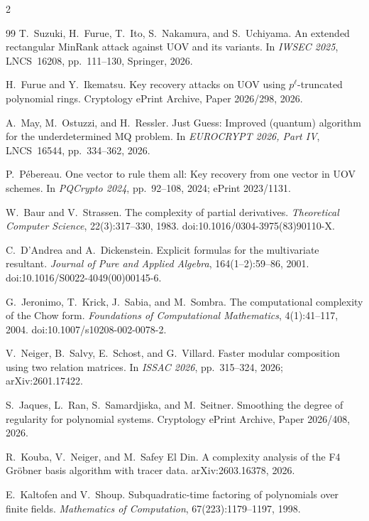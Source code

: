 \documentclass[11pt,a4paper]{article}
\theoremstyle{definition}
\theoremstyle{remark}
\begin{document}
\begin{multicols}{2}
\begin{thebibliography}{99}
T.~Suzuki, H.~Furue, T.~Ito, S.~Nakamura, and S.~Uchiyama.
\newblock An extended rectangular MinRank attack against UOV and its variants.
\newblock In \emph{IWSEC 2025}, LNCS~16208, pp.~111--130, Springer, 2026.

H.~Furue and Y.~Ikematsu.
\newblock Key recovery attacks on UOV using $p^\ell$-truncated polynomial rings.
\newblock Cryptology ePrint Archive, Paper 2026/298, 2026.

A.~May, M.~Ostuzzi, and H.~Ressler.
\newblock Just Guess: Improved (quantum) algorithm for the underdetermined MQ problem.
\newblock In \emph{EUROCRYPT 2026, Part IV}, LNCS~16544, pp.~334--362, 2026.

P.~P\'ebereau.
\newblock One vector to rule them all: Key recovery from one vector in UOV schemes.
\newblock In \emph{PQCrypto 2024}, pp.~92--108, 2024; ePrint 2023/1131.


W.~Baur and V.~Strassen.
\newblock The complexity of partial derivatives.
\newblock \emph{Theoretical Computer Science}, 22(3):317--330, 1983.
\newblock doi:10.1016/0304-3975(83)90110-X.

C.~D'Andrea and A.~Dickenstein.
\newblock Explicit formulas for the multivariate resultant.
\newblock \emph{Journal of Pure and Applied Algebra}, 164(1--2):59--86, 2001.
\newblock doi:10.1016/S0022-4049(00)00145-6.

G.~Jeronimo, T.~Krick, J.~Sabia, and M.~Sombra.
\newblock The computational complexity of the Chow form.
\newblock \emph{Foundations of Computational Mathematics}, 4(1):41--117, 2004.
\newblock doi:10.1007/s10208-002-0078-2.

V.~Neiger, B.~Salvy, E.~Schost, and G.~Villard.
\newblock Faster modular composition using two relation matrices.
\newblock In \emph{ISSAC 2026}, pp.~315--324, 2026; arXiv:2601.17422.

S.~Jaques, L.~Ran, S.~Samardjiska, and M.~Seitner.
\newblock Smoothing the degree of regularity for polynomial systems.
\newblock Cryptology ePrint Archive, Paper 2026/408, 2026.

R.~Kouba, V.~Neiger, and M.~Safey El Din.
\newblock A complexity analysis of the F4 Gr\"obner basis algorithm with tracer data.
\newblock arXiv:2603.16378, 2026.

E.~Kaltofen and V.~Shoup.
\newblock Subquadratic-time factoring of polynomials over finite fields.
\newblock \emph{Mathematics of Computation}, 67(223):1179--1197, 1998.


\end{thebibliography}
\end{multicols}
\end{document}
